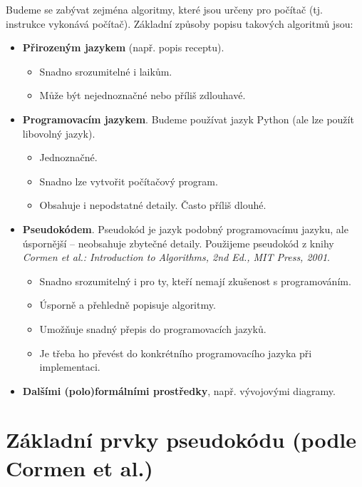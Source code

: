 \documentclass[openany,12pt,a4paper]{book}
\begin{document}
Budeme se zabývat zejména algoritmy, které jsou určeny pro počítač (tj. instrukce vykonává počítač).  
Základní způsoby popisu takových algoritmů jsou:

\begin{itemize}
  \item \textbf{Přirozeným jazykem} (např. popis receptu).
  \begin{itemize}
    \item[\textbf{+}] Snadno srozumitelné i laikům.
    \item[\textbf{--}] Může být nejednoznačné nebo příliš zdlouhavé.
  \end{itemize}

  \item \textbf{Programovacím jazykem}. Budeme používat jazyk Python (ale lze použít libovolný jazyk).
  \begin{itemize}
    \item[\textbf{+}] Jednoznačné.
    \item[\textbf{+}] Snadno lze vytvořit počítačový program.
    \item[\textbf{--}] Obsahuje i nepodstatné detaily. Často příliš dlouhé.
  \end{itemize}
  
  \item \textbf{Pseudokódem}. Pseudokód je jazyk podobný programovacímu jazyku, ale úspornější – neobsahuje zbytečné detaily. Použijeme pseudokód z knihy \emph{Cormen et al.: Introduction to Algorithms, 2nd Ed., MIT Press, 2001}.
  \begin{itemize}
    \item[\textbf{+}] Snadno srozumitelný i pro ty, kteří nemají zkušenost s programováním.  
    \item[\textbf{+}] Úsporně a přehledně popisuje algoritmy.  
    \item[\textbf{+}] Umožňuje snadný přepis do programovacích jazyků.
    \item[\textbf{--}] Je třeba ho převést do konkrétního programovacího jazyka při implementaci.
  \end{itemize}

  \item \textbf{Dalšími (polo)formálními prostředky}, např. vývojovými diagramy.
\end{itemize}

\section{Základní prvky pseudokódu (podle Cormen et al.)}
\end{document}
